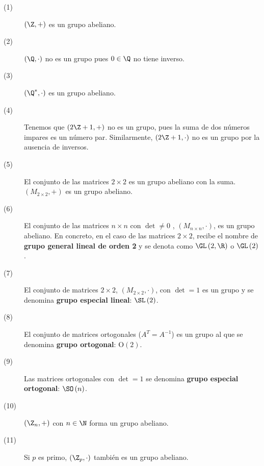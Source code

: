 \begin{eg}
\normalfont 
\begin{description}
\item[(1)] $\displaystyle \left(\Z, +\right) $ es un grupo abeliano. 
\item[(2)] $\displaystyle \left(\Q, \cdot\right) $ no es un grupo pues $\displaystyle 0 \in \Q $ no tiene inverso. 
\item[(3)] $\displaystyle \left(\Q^{*}, \cdot\right) $ es un grupo abeliano. 
\item[(4)] Tenemos que $\displaystyle \left(2\Z+1, +\right) $ no es un grupo, pues la suma de dos números impares es un número par. Similarmente, $\displaystyle \left(2\Z+1, \cdot \right) $ no es un grupo por la ausencia de inversos. 
\item[(5)] El conjunto de las matrices $\displaystyle 2 \times 2 $ es un grupo abeliano con la suma. $\displaystyle \left(M_{2\times2}, +\right) $ es un grupo abeliano. 
\item[(6)] El conjunto de las matrices $\displaystyle n \times n $ con $\displaystyle \det \neq 0 $ , $\displaystyle \left(M_{n\times n}, \cdot\right) $, es un grupo abeliano. En concreto, en el caso de las matrices $\displaystyle 2 \times 2 $, recibe el nombre de \textbf{grupo general lineal de orden 2} y se denota como $\displaystyle \GL\left(2, \R\right) $ o $\displaystyle \GL\left(2\right) $. 
\item[(7)] El conjunto de matrices $\displaystyle 2 \times 2 $, $\displaystyle \left(M_{2\times2}, \cdot\right) $, con $\displaystyle \det = 1 $ es un grupo y se denomina \textbf{grupo especial lineal}: $\displaystyle \SL\left(2\right) $.
\item[(8)] El conjunto de matrices ortogonales ($\displaystyle A^{T} = A^{-1} $) es un grupo al que se denomina \textbf{grupo ortogonal}: $\displaystyle \text{O}\left(2\right) $.
\item[(9)] Las matrices ortogonales con $\displaystyle \det = 1 $ se denomina \textbf{grupo especial ortogonal}: $\displaystyle \SO\left(n\right) $.
\item[(10)] $\displaystyle \left(\Z_{n}, +\right) $ con $\displaystyle n \in \N $ forma un grupo abeliano. 
\item[(11)] Si $\displaystyle p $ es primo, $\displaystyle \left(\Z_{p}, \cdot \right) $ también es un grupo abeliano. 
\end{description}
\end{eg}

